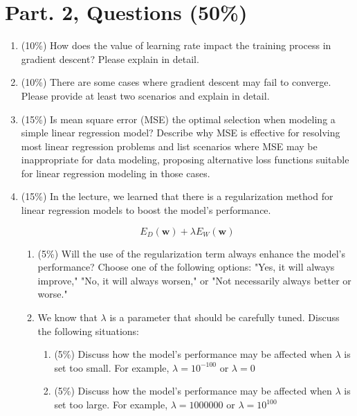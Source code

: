 \documentclass[twocolumn]{extarticle}
\begin{document}
\section{Part. 2, Questions (50\%)}
\begin{enumerate}
\item (10\%) How does the value of learning rate impact the training process in gradient descent? Please explain in detail.
\item (10\%) There are some cases where gradient descent may fail to converge. Please provide at least two scenarios and explain in detail.
\item (15\%) Is mean square error (MSE) the optimal selection when modeling a simple linear regression model? Describe why MSE is effective for resolving most linear regression problems and list scenarios where MSE may be inappropriate for data modeling, proposing alternative loss functions suitable for linear regression modeling in those cases.
\item (15\%) In the lecture, we learned that there is a regularization method for linear regression models to boost the model’s performance.

\begin{equation*}
E_{D}(\textbf{w}) + \lambda E_{W}(\textbf{w})
\end{equation*}

\begin{enumerate}[label*=\arabic*.]
	\item (5\%) Will the use of the regularization term always enhance the model's performance? Choose one of the following options: "Yes, it will always improve," "No, it will always worsen," or "Not necessarily always better or worse."
	\item We know that $\lambda$ is a parameter that should be carefully tuned. Discuss the following situations:
	\begin{enumerate}[label*=\arabic*.]
		\item (5\%) Discuss how the model’s performance may be affected when $\lambda$ is set too small. For example, $\lambda=10^{-100}$ or $\lambda=0$
		\item (5\%) Discuss how the model’s performance may be affected when $\lambda$ is set too large. For example, $\lambda=1000000$ or $\lambda=10^{100}$
	\end{enumerate}
\end{enumerate}
\end{enumerate}
\end{document}
